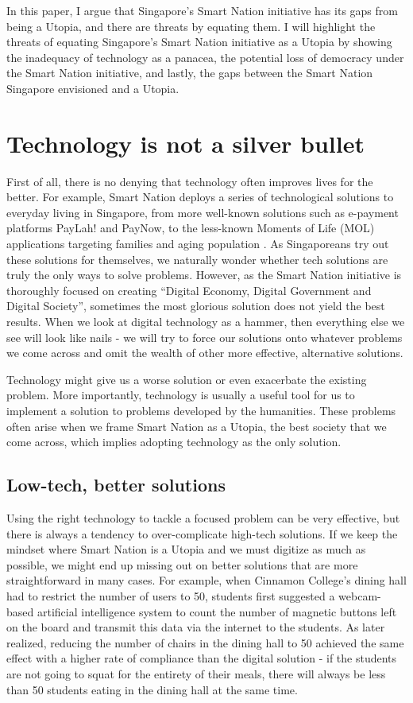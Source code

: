 \documentclass[11pt]{article}
\begin{document}
In this paper, I argue that Singapore's Smart Nation initiative has its gaps
from being a Utopia, and there are threats by equating them. I will highlight
the threats of equating Singapore's Smart Nation initiative as a Utopia by
showing the inadequacy of technology as a panacea, the potential loss of
democracy under the Smart Nation initiative, and lastly, the gaps between the
Smart Nation Singapore envisioned and a Utopia.

\section{Technology is not a silver bullet}
\label{sec:org123f904}
First of all, there is no denying that technology often improves lives for the
better. For example, Smart Nation deploys a series of technological solutions to
everyday living in Singapore, from more well-known solutions such as e-payment
platforms PayLah! and PayNow, to the less-known Moments of Life (MOL)
applications targeting families and aging population \cite{smart_nation}. As
Singaporeans try out these solutions for themselves, we naturally wonder whether
tech solutions are truly the only ways to solve problems. However, as the
Smart Nation initiative is thoroughly focused on creating ``Digital Economy,
Digital Government and Digital Society'', sometimes the most glorious solution
does not yield the best results. When we look at digital technology as a hammer,
then everything else we see will look like nails - we will try to force our
solutions onto whatever problems we come across and omit the wealth of other
more effective, alternative solutions.

Technology might give us a worse solution or even exacerbate the existing
problem. More importantly, technology is usually a useful tool for us to
implement a solution to problems developed by the humanities. These problems
often arise when we frame Smart Nation as a Utopia, the best society that we
come across, which implies adopting technology as the only solution.

\subsection{Low-tech, better solutions}
\label{sec:org04f5ac2}
Using the right technology to tackle a focused problem can be very effective,
but there is always a tendency to over-complicate high-tech solutions. If we
keep the mindset where Smart Nation is a Utopia and we must digitize as much as
possible, we might end up missing out on better solutions that are more
straightforward in many cases. For example, when Cinnamon College's dining hall
had to restrict the number of users to 50, students first suggested a
webcam-based artificial intelligence system to count the number of magnetic
buttons left on the board and transmit this data via the internet to the
students. As later realized, reducing the number of chairs in the dining hall
to 50 achieved the same effect with a higher rate of compliance than the digital
solution - if the students are not going to squat for the entirety of their
meals, there will always be less than 50 students eating in the dining hall at
the same time.
\end{document}
